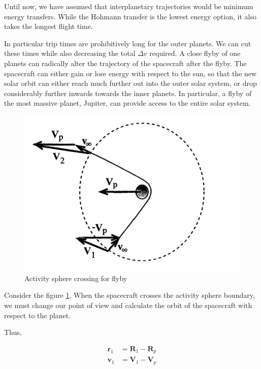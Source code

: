 \documentclass{article}
\theoremstyle{definition}
\begin{document}
Until now, we have assumed that interplanetary trajectories would be minimum energy transfers. 
While the Hohmann transfer is the lowest energy option, it also takes the longest flight time.

In particular trip times are prohibitively long for the outer planets.
We can cut these times while also decreasing the total $\Delta v$ required.
A close flyby of one planets can radically alter the trajectory of the spacecraft after the flyby. 
The spacecraft can either gain or lose energy with respect to the sun, so that the new solar orbit can either reach much further out into the outer solar system, or drop considerably further inwards towards the inner planets.
In particular, a flyby of the most massive planet, Jupiter, can provide access to the entire solar system.

\begin{figure}[h]
    \centering
    \includegraphics[scale=0.3]{image 18.png}
    \caption{Activity sphere crossing for flyby}
    \label{fig:flyby}
\end{figure}

Consider the figure \ref{fig:flyby}.
When the spacecraft crosses the activity sphere boundary, we must change our point of view and calculate the orbit of the spacecraft with respect to the planet.

Thus, 

\begin{equation}
\begin{split}
    \boldsymbol{r}_1 & = \boldsymbol{R}_1 - \boldsymbol{R}_p\\
    \boldsymbol{v}_1 & = \boldsymbol{V}_1 - \boldsymbol{V}_p\\
\end{split}
\end{equation}
\end{document}
